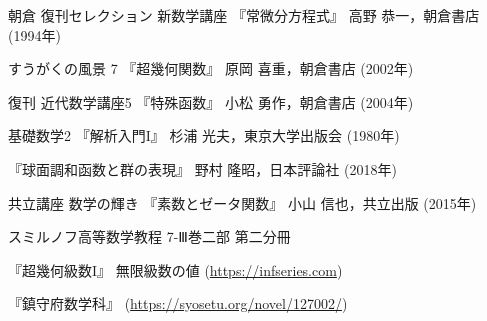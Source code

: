 \documentclass[a4paper,draft]{ltjsarticle}
\begin{document}
\begin{thebibliography}{9}\label{sec:参考文献}

     朝倉 復刊セレクション 新数学講座 『常微分方程式』 高野 恭一，朝倉書店 (1994年)

     すうがくの風景 7 『超幾何関数』 原岡 喜重，朝倉書店 (2002年)

     復刊 近代数学講座5 『特殊函数』 小松 勇作，朝倉書店 (2004年)

     基礎数学2 『解析入門I』 杉浦 光夫，東京大学出版会 (1980年)

     『球面調和函数と群の表現』 野村 隆昭，日本評論社 (2018年)

     共立講座 数学の輝き 『素数とゼータ関数』 小山 信也，共立出版 (2015年)

     スミルノフ高等数学教程 7-Ⅲ巻二部 第二分冊

     『超幾何級数I』 無限級数の値 (\url{https://infseries.com})

     『鎮守府数学科』 (\url{https://syosetu.org/novel/127002/})
\end{thebibliography}
\end{document}
